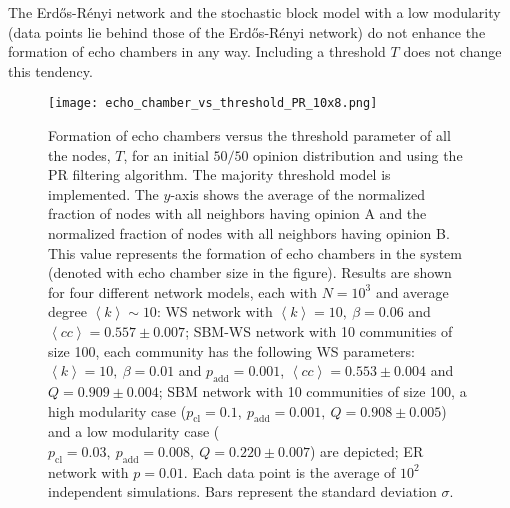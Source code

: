 \documentclass[11 pt , letterpaper , twoside , openright]{book}
\begin{document}
\newline
The Erd\H{o}s-R\'{e}nyi network and the stochastic block model with a low modularity (data points lie behind those of the Erd\H{o}s-R\'{e}nyi network) do not enhance the formation of echo chambers in any way. Including a threshold $T$ does not change this tendency. %
\begin{figure}[H]
	\texttt{[image: echo\_chamber\_vs\_threshold\_PR\_10x8.png]}
	\captionsetup{format=plain}
	\caption[Formation of echo chambers versus the threshold parameter of all the nodes, $T$, for the PR filtering algorithm and an initial $50/50$ opinion distribution. The majority threshold model is implemented.]{Formation of echo chambers versus the threshold parameter of all the nodes, $T$, for an initial $50/50$ opinion distribution and using the PR filtering algorithm. The majority threshold model is implemented. The $y$-axis shows the average of the normalized fraction of nodes with all neighbors having opinion A and the normalized fraction of nodes with all neighbors having opinion B. This value represents the formation of echo chambers in the system (denoted with echo chamber size in the figure). Results are shown for four different network models, each with $N=10^3$ and average degree $\left<k\right> \sim 10$: WS network with $\left<k\right> =10,\ \beta = 0.06$ and $\left<cc\right> = 0.557 \pm 0.007$; SBM-WS network with 10 communities of size 100, each community has the following WS parameters: $\left<k\right> = 10,\ \beta = 0.01$ and $p_{\text{add}} = 0.001$, $\left<cc\right> = 0.553 \pm 0.004$ and $Q = 0.909 \pm 0.004$; SBM network with 10 communities of size 100, a high modularity case ($p_{\text{cl}} = 0.1,\ p_{\text{add}} = 0.001,\ Q = 0.908 \pm 0.005$) and a low modularity case ($p_{\text{cl}} = 0.03,\ p_{\text{add}} = 0.008,\ Q = 0.220 \pm 0.007$) are depicted; ER network with $p= 0.01$. Each data point is the average of $10^2$ independent simulations. Bars represent the standard deviation $\sigma$.}
\label{echo_vs_threshold_PR}
\end{figure}
\noindent
\end{document}
